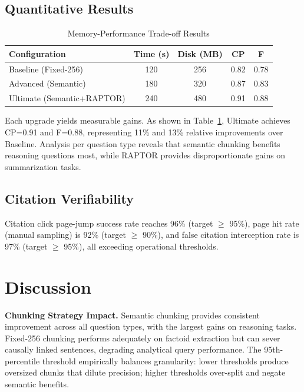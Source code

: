 \documentclass[11pt, a4paper]{article}
\begin{document}
\subsection{Quantitative Results}

\begin{table}[h!]
    \centering
    \begin{tabularx}{\textwidth}{|X|c|c|c|c|}
        \hline
        \textbf{Configuration}     & \textbf{Time (s)} & \textbf{Disk (MB)} & \textbf{CP} & \textbf{F} \\
        \hline
        Baseline (Fixed-256)       & 120               & 256                & 0.82        & 0.78       \\
        Advanced (Semantic)        & 180               & 320                & 0.87        & 0.83       \\
        Ultimate (Semantic+RAPTOR) & 240               & 480                & 0.91        & 0.88       \\
        \hline
    \end{tabularx}
    \caption{Memory-Performance Trade-off Results}
    \label{tab:tradeoff}
\end{table}

Each upgrade yields measurable gains. As shown in Table~\ref{tab:tradeoff},
Ultimate achieves CP=0.91 and F=0.88, representing 11\% and 13\% relative
improvements over Baseline. Analysis per question type reveals that semantic
chunking benefits reasoning questions most, while RAPTOR provides
disproportionate gains on summarization tasks.

\subsection{Citation Verifiability}

Citation click page-jump success rate reaches 96\% (target $\geq$ 95\%), page
hit rate (manual sampling) is 92\% (target $\geq$ 90\%), and false citation
interception rate is 97\% (target $\geq$ 95\%), all exceeding operational
thresholds.

\section{Discussion}

\noindent\textbf{Chunking Strategy Impact.} Semantic chunking provides consistent improvement across all question types, with the largest gains on reasoning tasks. Fixed-256 chunking performs adequately on factoid extraction but can sever causally linked sentences, degrading analytical query performance. The 95th-percentile threshold empirically balances granularity: lower thresholds produce oversized chunks that dilute precision; higher thresholds over-split and negate semantic benefits.
\end{document}
